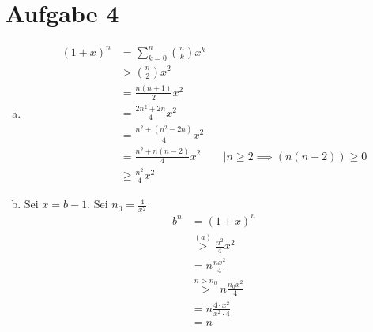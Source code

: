 \documentclass{article}
\begin{document}
	\section*{Aufgabe 4}
	\begin{enumerate}[(a)]
	\item \begin{align*}
			(1+x)^n &= \sum_{k=0}^{n} \binom{n}{k}x^k \\
			&> \binom{n}{2} x^2\\
			&= \frac{n(n+1)}{2} x^2 \\
			&= \frac{2n^2 + 2n}{4} x^2\\
			&= \frac{n^2 + (n^2-2n)}{4} x^2\\
			&= \frac{n^2 + n(n-2)}{4} x^2&&|n\geq 2 \implies (n(n-2)) \geq 0\\
			&\geq \frac{n^2}{4}x^2
		\end{align*}
	\item Sei $x= b-1$. Sei $n_0 = \frac{4}{x^2}$ 
	\begin{align*}
		b^n &= (1+x)^n\\
		&\overset{(a)}{>} \frac{n^2}{4}x^2\\
		&= n\frac{nx^2}{4}\\
		&\overset{n>n_0}{>} n\frac{n_0x^2}{4}\\
		&= n\frac{4\cdot x^2}{x^2\cdot4}\\
		&= n
	\end{align*}
\end{enumerate}
\end{document}
